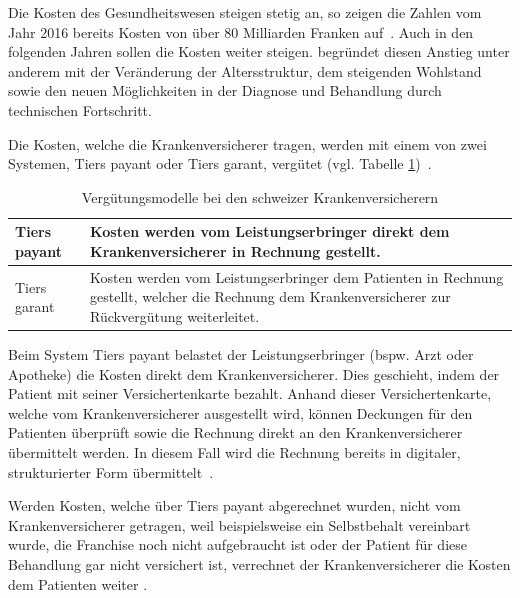 Die Kosten des Gesundheitswesen steigen stetig an, so zeigen die Zahlen vom Jahr 2016 bereits Kosten von über 80 Milliarden Franken auf~\autocite{BfS2018}. Auch in den folgenden Jahren sollen die Kosten weiter steigen. \textcite{Kirchgassner2009} begründet diesen Anstieg unter anderem mit der Veränderung der Altersstruktur, dem steigenden Wohlstand sowie den neuen Möglichkeiten in der Diagnose und Behandlung durch technischen Fortschritt.

Die Kosten, welche die Krankenversicherer tragen, werden mit einem von zwei Systemen, Tiers payant oder Tiers garant, vergütet (vgl. Tabelle \ref{tiers})~\autocite{EDI2017}. 

\begin{table}
    \renewcommand{\arraystretch}{1.25}
    \setlength{\tabcolsep}{10pt}
    \caption{Vergütungsmodelle bei den schweizer Krankenversicherern}
    \label{tiers}
    \begin{tabular}{| p{} | p{} |}
        \hline
         Tiers payant & Kosten werden vom Leistungserbringer direkt dem Krankenversicherer in Rechnung gestellt. \\
        \hline
         Tiers garant & Kosten werden vom Leistungserbringer dem Patienten in Rechnung gestellt, welcher die Rechnung dem Krankenversicherer zur Rückvergütung weiterleitet. \\
        \hline
    \end{tabular}
\end{table}

Beim System Tiers payant belastet der Leistungserbringer (bspw. Arzt oder Apotheke) die Kosten direkt dem Krankenversicherer. Dies geschieht, indem der Patient mit seiner Versichertenkarte bezahlt. Anhand dieser Versichertenkarte, welche vom Krankenversicherer ausgestellt wird, können Deckungen für den Patienten überprüft sowie die Rechnung direkt an den Krankenversicherer übermittelt werden. In diesem Fall wird die Rechnung bereits in digitaler, strukturierter Form übermittelt~\autocite{EDI2017}. 

Werden Kosten, welche über Tiers payant abgerechnet wurden, nicht vom Krankenversicherer getragen, weil beispielsweise ein Selbstbehalt vereinbart wurde, die Franchise noch nicht aufgebraucht ist oder der Patient für diese Behandlung gar nicht versichert ist, verrechnet der Krankenversicherer die Kosten dem Patienten weiter \autocite{EDI2017}.


